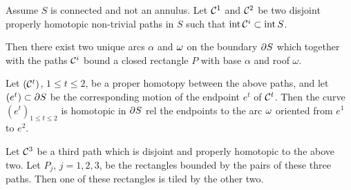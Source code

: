 \begin{lem}\label{alpha-om}
 Assume $S$ is connected and not an annulus.
Let ${\cal C}^1$ and ${\cal C}^2$ be two disjoint properly homotopic non-trivial paths in $S$ such that $\operatorname{int} {\cal C}^i\subset \operatorname{int} S$.
 
 \ssk{}
Then there exist two unique arcs $\alpha$ and ${\omega}$ on the boundary $\partial S$ which together
with the paths ${\cal C}^i$ bound a closed rectangle $P$ with base $\alpha$ and roof $\omega$. 

\ssk{}
 Let $({\cal C}^t)$, $1\leq t\leq 2$, be a proper homotopy between the above  paths,
   and let $(e^t)\subset \partial S$ be the corresponding motion of the endpoint $e^t$ of ${\cal C}^t$.
   Then the curve $(e^t)_{1\leq t\leq 2}$ is homotopic in $\partial S$ rel the endpoints 
    to the arc ${\omega}$ oriented from $e^1$ to $e^2$.      

\ssk{} Let ${\cal C}^3$ be a third path which is disjoint and properly homotopic to the above two.
Let $P_j$, $j=1,2,3$, be the rectangles bounded by  the pairs of these three paths.
Then one of these rectangles is tiled by the other two. 

\end{lem}

